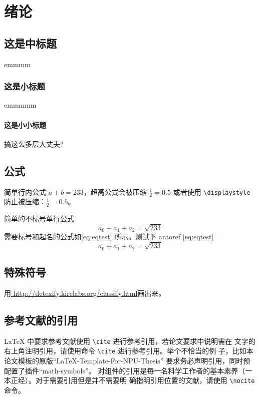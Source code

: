 \documentclass[lang=chs, degree=phd, blindreview=false, winfonts=true]{nputhesis}
\begin{document}
\chapter{绪论}
\section{这是中标题}
emmmm
\subsection{这是小标题}
emmmmm
\subsubsection{这是小小标题}
搞这么多层大丈夫?

\section{公式}
简单行内公式 $a+b=233$，超高公式会被压缩 $\frac{1}{2}=0.5$ 或者使用
\lstinline`\displaystyle` 防止被压缩：$\displaystyle \frac{1}{2}=0.5$。

简单的不标号单行公式
$$a_0+a_1+a_2=\sqrt{233}$$
需要标号和起名的公式如\autoref{eq:eqtest} 所示。测试下 autoref \autoref{eq:eqtest}
\begin{equation}
    \label{eq:eqtest}
    a_0 + a_1 + a_2 = \sqrt{233}
\end{equation}

\section{特殊符号}

用\href{http://detexify.kirelabs.org/classify.html}{
    http://detexify.kirelabs.org/classify.html}画出来。

\section{参考文献的引用}

\LaTeX{} 中要求参考文献使用 \lstinline`\cite` 进行参考引用，若论文要求中说明需在
文字的右上角注明引用，请使用命令 \lstinline`\cite` 进行参考引用。举个不恰当的例
子，比如本论文模板的原版“LaTeX-Template-For-NPU-Thesis”\cite{NWPUThesisLaTeXTemplate}
要求务必声明引用，同时预配置了插件“math-symbols”\cite{MathSymbolsinLaTeXbypolossk}。
对组件的引用是每一名科学工作者的基本素养（一本正经）。对于需要引用但是并不需要明
确指明引用位置的文献，请使用 \lstinline`\nocite` 命令。
\end{document}
